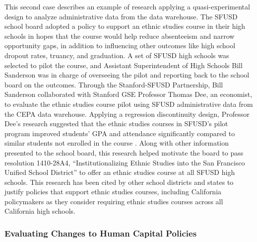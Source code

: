 This second case describes an example of research applying a quasi-experimental design to analyze administrative data from the data warehouse. The SFUSD school board adopted a policy to support an ethnic studies course in their high schools in hopes that the course would help reduce absenteeism and narrow opportunity gaps, in addition to influencing other outcomes like high school dropout rates, truancy, and graduation. A set of SFUSD high schools was selected to pilot the course, and Assistant Superintendent of High Schools Bill Sanderson was in charge of overseeing the pilot and reporting back to the school board on the outcomes. Through the Stanford-SFUSD Partnership, Bill Sanderson collaborated with Stanford GSE Professor Thomas Dee, an economist, to evaluate the ethnic studies course pilot using SFUSD administrative data from the CEPA data warehouse. Applying a regression discontinuity design, Professor Dee's research suggested that the ethnic studies courses in SFUSD's pilot program improved students' GPA and attendance significantly compared to similar students not enrolled in the course \citep{dee2017}. Along with other information presented to the school board, this research helped motivate the board to pass resolution 1410-28A4, ``Institutionalizing Ethnic Studies into the San Francisco Unified School District'' \citep{sanfranciscounifiedschooldistrict2014} to offer an ethnic studies course at all SFUSD high schools. This research has been cited by other school districts \citep{cuevas2019} and states \citep{ragland2017} to justify policies that support ethnic studies courses, including California policymakers as they consider requiring ethnic studies courses across all California high schools.

\hypertarget{evaluating-changes-to-human-capital-policies}{%
\subsubsection*{Evaluating Changes to Human Capital Policies}\label{evaluating-changes-to-human-capital-policies}}

